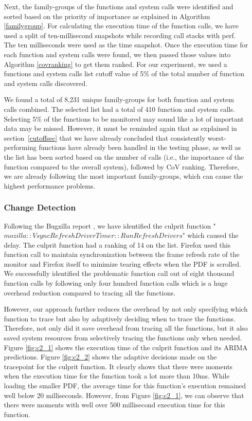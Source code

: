 \documentclass[pdflatex,sn-nature]{sn-jnl}%
\theoremstyle{thmstyleone}%
\theoremstyle{thmstyletwo}%
\theoremstyle{thmstylethree}%
\begin{document}
Next, the family-groups of the functions and system calls were identified and sorted based on the priority of importance as explained in Algorithm \ref{familygroup}. For calculating the execution time of the function calls, we have used a split of ten-millisecond snapshots while recording call stacks with perf. The ten milliseconds were used as the time snapshot. Once the execution time for each function and system calls were found, we then passed those values into Algorithm \ref{covranking} to get them ranked. For our experiment, we used a functions and system calls list cutoff value of 5\% of the total number of function and system calls discovered.

We found a total of 8,231 unique family-groups for both function and system calls combined. The selected list had a total of 410 function and system calls. Selecting 5\% of the functions to be monitored may sound like a lot of important data may be missed. However, it must be reminded again that as explained in section~\ref{cutoffsec} that we have already concluded that consistently worst-performing functions have already been handled in the testing phase, as well as the list has been sorted based on the number of calls (i.e., the importance of the function compared to the overall system), followed by CoV ranking. Therefore, we are already following the most important family-groups, which can cause the highest performance problems.


\subsubsection{Change Detection}\label{case studies & evaluation: change detection case study 2}

Following the Bugzilla report \cite{clessili-2022}, we have identified the culprit function "$mozilla::VsyncRefreshDriverTimer::RunRefreshDrivers$" which caused the delay. The culprit function had a ranking of 14 on the list. Firefox used this function call to maintain synchronization between the frame refresh rate of the monitor and Firefox itself to minimize tearing effects when the PDF is scrolled. We successfully identified the problematic function call out of eight thousand function calls by following only four hundred function calls which is a huge overhead reduction compared to tracing all the functions.

However, our approach further reduces the overhead by not only specifying which function to trace but also by adaptively deciding when to trace the functions. Therefore, not only did it save overhead from tracing all the functions, but it also saved system resources from selectively tracing the functions only when needed.
Figure \ref{fig:c2_1} shows the execution time of the culprit function and its ARIMA predictions. Figure \ref{fig:c2_2} shows the adaptive decisions made on the tracepoint for the culprit function. It clearly shows that there were moments when the execution time for the function took a lot more than 10ms. While loading the smaller PDF, the average time for this function's execution remained well below 20 milliseconds. However, from Figure \ref{fig:c2_1}, we can observe that there were moments with well over 500 millisecond execution time for this function.
\end{document}
